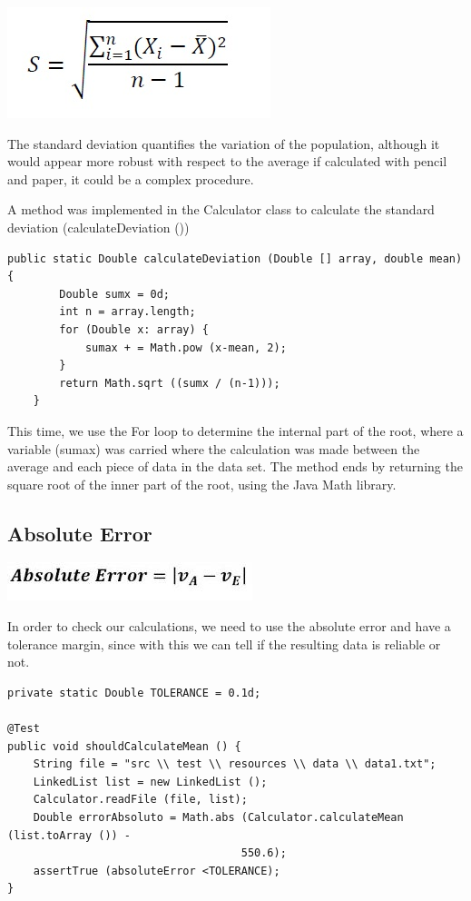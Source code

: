 \documentclass[
	12pt, %
]{fphw}
\begin{document}
\includegraphics [scale = 0.8] {2583684_orig.jpg}

The standard deviation quantifies the variation of the population, although it would appear more robust with respect to the average if calculated with pencil and paper, it could be a complex procedure.

A method was implemented in the Calculator class to calculate the standard deviation (calculateDeviation ())

\begin{verbatim}
public static Double calculateDeviation (Double [] array, double mean) {
        Double sumx = 0d;
        int n = array.length;
        for (Double x: array) {
            sumax + = Math.pow (x-mean, 2);
        }
        return Math.sqrt ((sumx / (n-1)));
    }
\end{verbatim}

This time, we use the For loop to determine the internal part of the root, where a variable (sumax) was carried where the calculation was made between the average and each piece of data in the data set. The method ends by returning the square root of the inner part of the root, using the Java Math library.



\subsection * {Absolute Error}

\includegraphics [scale = 0.8] {Capture.JPG}


In order to check our calculations, we need to use the absolute error and have a tolerance margin, since with this we can tell if the resulting data is reliable or not.

\begin{verbatim}
private static Double TOLERANCE = 0.1d;

@Test
public void shouldCalculateMean () {
    String file = "src \\ test \\ resources \\ data \\ data1.txt";
    LinkedList list = new LinkedList ();
    Calculator.readFile (file, list);
    Double errorAbsoluto = Math.abs (Calculator.calculateMean (list.toArray ()) -
                                    550.6);
    assertTrue (absoluteError <TOLERANCE);
}
\end{verbatim}
\end{document}
